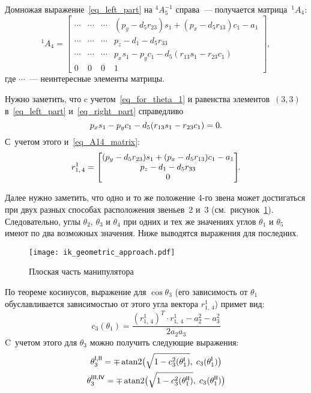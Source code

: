 Домножая выражение~\eqref{eq_left_part} на ${}^4A_5^{-1}$ справа~--- получается матрица~${}^1A_4$:
\begin{equation}\label{eq_A14_matrix}
    {}^1A_4 =
    \begin{bmatrix}
        \cdots & \cdots & \cdots & (p_y - d_5 r_{23})s_1 + (p_x - d_5 r_{13})c_1 - a_1\\
        \cdots & \cdots & \cdots & p_z - d_1 - d_5 r_{33}\\
        \cdots & \cdots & \cdots & p_x s_1 - p_y c_1 - d_5(r_{13} s_1 - r_{23} c_1)\\
        0 & 0 & 0 & 1
    \end{bmatrix}\!\!,
\end{equation}
где $\cdots$~--- неинтересные элементы матрицы.

Нужно заметить, что c учетом~\eqref{eq_for_theta_1} и равенства элементов~$(3,3)$ в~\eqref{eq_left_part} и~\eqref{eq_right_part} справедливо
\begin{equation}
p_x s_1 - p_y c_1 - d_5(r_{13} s_1 - r_{23} c_1) = 0\ldotp
\end{equation}
С~учетом этого и~\eqref{eq_A14_matrix}:
\begin{equation}\label{eq_r_1_1_4}
    r^1_{1,\,4} =
    \begin{bmatrix}
        (p_y - d_5 r_{23})s_1 + (p_x - d_5 r_{13})c_1 - a_1 \\
        p_z - d_1 - d_5 r_{33} \\
        0
    \end{bmatrix}\!\!\ldotp
\end{equation}

Далее нужно заметить, что одно и то же положение 4-го звена может достигаться при двух разных способах расположения звеньев~2 и~3 (см.~рисунок~\ref{ik_geometric}).
Следовательно, углы $\theta_2$, $\theta_3$ и $\theta_4$ при одних и тех же значениях углов $\theta_1$ и $\theta_5$ имеют по два возможных значения. 
Ниже выводятся выражения для последних.

\begin{figure}[h!]
	\centering
	\texttt{[image: ik\_geometric\_approach.pdf]}
	\caption{Плоская часть манипулятора}
	\label{ik_geometric}
\end{figure}

По теореме косинусов, выражение для $\cos\theta_3$ (его зависимость от $\theta_1$ обуславливается зависимостью от этого угла вектора $r^1_{1,\,4}$) примет вид:
\begin{equation}
	c_3(\theta_1) = \frac{(r^1_{1,\,4})^T \!\! \cdot r^1_{1,\,4}- a_2^2 - a_3^2}{2 a_2 a_3}
\end{equation}
C~учетом этого для $\theta_3$ можно получить следующие выражения:
\begin{gather}
	\theta_3^\msf{I,II} = \mp \atan2\bigl(\sqrt{1 - c_3^2(\theta_1^\msf{I})},\; c_3(\theta_1^\msf{I})\bigr)\\
	\theta_3^\msf{III,IV} = \mp \atan2\bigl(\sqrt{1 - c_3^2(\theta_1^\msf{II})},\; c_3(\theta_1^\msf{II})\bigr)
\end{gather}

